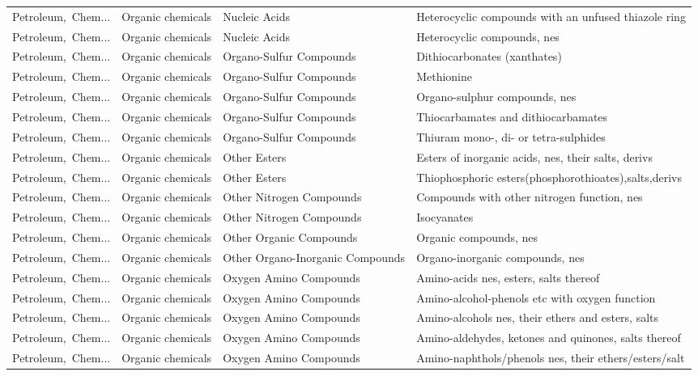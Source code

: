 \begin{appendices}
\begin{xltabular}{\textwidth}{|p{0.10\textwidth}|p{0.25\textwidth}|p{0.24\textwidth}|p{0.31\textwidth}|}
Petroleum,\ Chem... & Organic chemicals & Nucleic Acids & Heterocyclic compounds with an unfused thiazole ring \\
Petroleum,\ Chem... & Organic chemicals & Nucleic Acids & Heterocyclic compounds, nes \\
Petroleum,\ Chem... & Organic chemicals & Organo-Sulfur Compounds & Dithiocarbonates (xanthates) \\
Petroleum,\ Chem... & Organic chemicals & Organo-Sulfur Compounds & Methionine \\
Petroleum,\ Chem... & Organic chemicals & Organo-Sulfur Compounds & Organo-sulphur compounds, nes \\
Petroleum,\ Chem... & Organic chemicals & Organo-Sulfur Compounds & Thiocarbamates and dithiocarbamates \\
Petroleum,\ Chem... & Organic chemicals & Organo-Sulfur Compounds & Thiuram mono-, di- or tetra-sulphides \\
Petroleum,\ Chem... & Organic chemicals & Other Esters & Esters of inorganic acids, nes, their salts, derivs \\
Petroleum,\ Chem... & Organic chemicals & Other Esters & Thiophosphoric esters(phosphorothioates),salts,derivs \\
Petroleum,\ Chem... & Organic chemicals & Other Nitrogen Compounds & Compounds with other nitrogen function, nes \\
Petroleum,\ Chem... & Organic chemicals & Other Nitrogen Compounds & Isocyanates \\
Petroleum,\ Chem... & Organic chemicals & Other Organic Compounds & Organic compounds, nes \\
Petroleum,\ Chem... & Organic chemicals & Other Organo-Inorganic Compounds & Organo-inorganic compounds, nes \\
Petroleum,\ Chem... & Organic chemicals & Oxygen Amino Compounds & Amino-acids nes, esters, salts thereof \\
Petroleum,\ Chem... & Organic chemicals & Oxygen Amino Compounds & Amino-alcohol-phenols etc with oxygen function \\
Petroleum,\ Chem... & Organic chemicals & Oxygen Amino Compounds & Amino-alcohols nes, their ethers and esters, salts \\
Petroleum,\ Chem... & Organic chemicals & Oxygen Amino Compounds & Amino-aldehydes, ketones and quinones, salts thereof \\
Petroleum,\ Chem... & Organic chemicals & Oxygen Amino Compounds & Amino-naphthols/phenols nes, their ethers/esters/salt \\

\end{xltabular}
\end{appendices}
